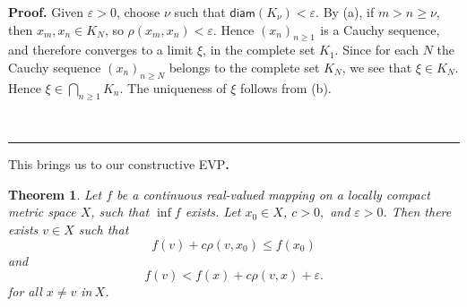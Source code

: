 \documentclass[11pt]{article}%
\newtheorem{theorem}{Theorem}
\newenvironment{proof}[1][Proof]{\noindent\textbf{#1.} }{\ \rule{0.5em}{0.5em}}
\begin{document}
\begin{proof}
Given $\varepsilon>0$, choose $\nu$ such that $\mathsf{diam}(K_{\nu
})<\varepsilon$. By (a), if $m>n\geqslant\nu$, then $x_{m},x_{n}\in K_{N}$, so
$\rho(x_{m},x_{n})<\varepsilon$. Hence $\left(  x_{n}\right)  _{n\geqslant
1}\,\ $is a Cauchy sequence, and therefore converges to a limit $\xi$, in the
complete set $K_{1}$. Since for each $N$ the Cauchy sequence $\left(
x_{n}\right)  _{n\geqslant N}$ belongs to the complete set $K_{N}$, we see
that $\xi\in K_{N}$. Hence $\xi\in%
{\textstyle\bigcap_{n\geqslant1}}
K_{n}$. The uniqueness of $\xi$ follows from (b).%
\hfill

\end{proof}

%

\medskip


This brings us to our constructive EVP\textbf{.}

\begin{theorem}
\label{Ekeland}Let $f$ be a continuous real-valued mapping on a locally
compact metric space $X$, such that $\inf f$ exists. Let $x_{0}\in X$, $c>0,$
and $\varepsilon>0$. Then there exists $v\in X$ such that%
\begin{equation}
f(v)+c\rho\left(  v,x_{0}\right)  \leqslant f\left(  x_{0}\right)  \label{1}%
\end{equation}
and%
\begin{equation}
f\left(  v\right)  <f(x)+c\rho\left(  v,x\right)  +\varepsilon. \label{2}%
\end{equation}
for all $x\neq v$ in$\ X$.
\end{theorem}
\end{document}
